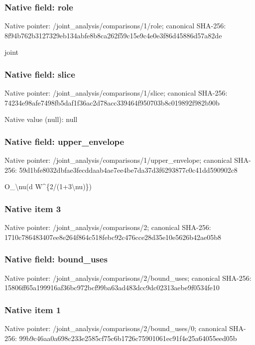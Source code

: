 \documentclass[10pt,a4paper]{article}
\begin{document}
\subsubsection{Native field: role}
Native pointer: /joint\_\allowbreak{}analysis/comparisons/1/role; canonical SHA-256: 8f94b762b3127329eb134abfe8b8ca262f59c15e9c4e0e3f86d45886d57a82de

\begingroup\raggedright\sloppy joint\par\endgroup

\subsubsection{Native field: slice}
Native pointer: /joint\_\allowbreak{}analysis/comparisons/1/slice; canonical SHA-256: 74234e98afe7498fb5daf1f36ac2d78acc339464f950703b8c019892f982b90b

Native value (null): null

\subsubsection{Native field: upper\_\allowbreak{}envelope}
Native pointer: /joint\_\allowbreak{}analysis/comparisons/1/upper\_\allowbreak{}envelope; canonical SHA-256: 59d1bfe8032dbfae3fecddaab4ae7ee4be7da37d3f6293877c0c41dd590902c8

\begingroup\raggedright\sloppy O\_\allowbreak{}\textbackslash{}nu(d W\textasciicircum{}\{2/\allowbreak{}(1+3\textbackslash{}nu)\})\par\endgroup

\subsubsection{Native item 3}
Native pointer: /joint\_\allowbreak{}analysis/comparisons/2; canonical SHA-256: 1710c786483407ee8e264f864c518febc92c476cce28d35e10e5626b42ae05b8

\subsubsection{Native field: bound\_\allowbreak{}uses}
Native pointer: /joint\_\allowbreak{}analysis/comparisons/2/bound\_\allowbreak{}uses; canonical SHA-256: 15806ff65a199916af36bc972bcf99ba63ad483dcc9dc02313aebe9f0534fe10

\subsubsection{Native item 1}
Native pointer: /joint\_\allowbreak{}analysis/comparisons/2/bound\_\allowbreak{}uses/0; canonical SHA-256: 99b9c46aa0a698c233e2585cf75c6b1726c75901061ec91f4e25a64055eed05b
\end{document}
